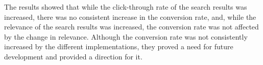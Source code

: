 The results showed that while the click-through rate of the search results was increased, there was no
consistent increase in the conversion rate, and, while the relevance of the search results was increased, the conversion
rate was not affected by the change in relevance.
Although the conversion rate was not consistently increased by the different implementations, they
proved a need for future development and provided a direction for it.



